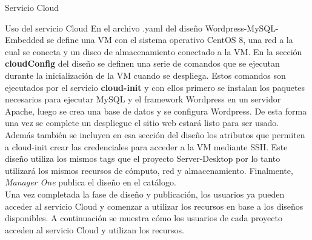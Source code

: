 \begin{subsection}{Servicio Cloud}
\begin{subsubsection}{Uso del servicio Cloud}
        \FloatBarrier
        En el archivo .yaml del diseño Wordpress-MySQL-Embedded se define una VM con el sistema operativo CentOS 8, una red a la cual se conecta y un disco de almacenamiento conectado a la VM. En la sección \textbf{cloudConfig} del diseño se definen una serie de comandos que se ejecutan durante la inicialización de la VM cuando se despliega. Estos comandos son ejecutados por el servicio \textbf{cloud-init} y con ellos primero se instalan los paquetes necesarios para ejecutar MySQL y el framework Wordpress en un servidor Apache, luego se crea una base de datos y se configura Wordpress. De esta forma una vez se complete un despliegue el sitio web estará listo para ser usado. Además también se incluyen en esa sección del diseño los atributos que permiten a cloud-init crear las credenciales para acceder a la VM mediante SSH. Este diseño utiliza los mismos tags que el proyecto Server-Desktop por lo tanto utilizará los mismos recursos de cómputo, red y almacenamiento. Finalmente, \textit{Manager One} publica el diseño en el catálogo.        
        \\
        Una vez completada la fase de diseño y publicación, los usuarios ya pueden acceder al servicio Cloud y comenzar a utilizar los recursos en base a los diseños disponibles. A continuación se muestra cómo los usuarios de cada proyecto acceden al servicio Cloud y utilizan los recursos. 

\end{subsubsection}
\end{subsection}
